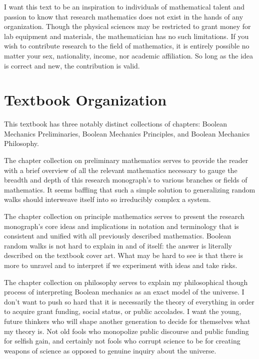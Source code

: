 \documentclass[10pt, a5paper, twoside, openright]{memoir}
\begin{document}
I want this text to be an inspiration to individuals of mathematical talent and passion to know that research mathematics does not exist in the hands of any organization. Though the physical sciences may be restricted to grant money for lab equipment and materials, the mathematician has no such limitations. If you wish to contribute research to the field of mathematics, it is entirely possible no matter your sex, nationality, income, nor academic affiliation. So long as the idea is correct and new, the contribution is valid.

\section{Textbook Organization}

This textbook has three notably distinct collections of chapters: Boolean Mechanics Preliminaries, Boolean Mechanics Principles, and Boolean Mechanics Philosophy. 

The chapter collection on preliminary mathematics serves to provide the reader with a brief overview of all the relevant mathematics necessary to gauge the breadth and depth of this research monograph's to various branches or fields of mathematics. It seems baffling that such a simple solution to generalizing random walks should interweave itself into so irreducibly complex a system.

The chapter collection on principle mathematics serves to present the research monograph's core ideas and implications in notation and terminology that is consistent and unified with all previously described mathematics. Boolean random walks is not hard to explain in and of itself: the answer is literally described on the textbook cover art. What may be hard to see is that there is more to unravel and to interpret if we experiment with ideas and take risks.

The chapter collection on philosophy serves to explain my philosophical though process of interpreting Boolean mechanics as an exact model of the universe. I don't want to push so hard that it is necessarily the theory of everything in order to acquire grant funding, social status, or public accolades. I want the young, future thinkers who will shape another generation to decide for themselves what my theory is. Not old fools who monopolize public discourse and public funding for selfish gain, and certainly not fools who corrupt science to be for creating weapons of science as opposed to genuine inquiry about the universe.
\end{document}
